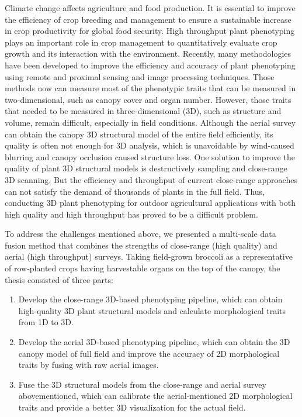 \begin{doublespace}
Climate change affects agriculture and food production. It is essential to improve the efficiency of crop breeding and management to ensure a sustainable increase in crop productivity for global food security. High throughput plant phenotyping plays an important role in crop management to quantitatively evaluate crop growth and its interaction with the environment. Recently, many methodologies have been developed to improve the efficiency and accuracy of plant phenotyping using remote and proximal sensing and image processing techniques. Those methods now can measure most of the phenotypic traits that can be measured in two-dimensional, such as canopy cover and organ number. However, those traits that needed to be measured in three-dimensional (3D), such as structure and volume, remain difficult, especially in field conditions. Although the aerial survey can obtain the canopy 3D structural model of the entire field efficiently, its quality is often not enough for 3D analysis, which is unavoidable by wind-caused blurring and canopy occlusion caused structure loss. One solution to improve the quality of plant 3D structural models is destructively sampling and close-range 3D scanning. But the efficiency and throughput of current close-range approaches can not satisfy the demand of thousands of plants in the full field. Thus, conducting 3D plant phenotyping for outdoor agricultural applications with both high quality and high throughput has proved to be a difficult problem.

To address the challenges mentioned above, we presented a multi-scale data fusion method that combines the strengths of close-range (high quality) and aerial (high throughput) surveys. Taking field-grown broccoli as a representative of row-planted crops having harvestable organs on the top of the canopy, the thesis consisted of three parts: 

\begin{enumerate}
  \item Develop the close-range 3D-based phenotyping pipeline, which can obtain high-quality 3D plant structural models and calculate morphological traits from 1D to 3D.
  \item Develop the aerial 3D-based phenotyping pipeline, which can obtain the 3D canopy model of full field and improve the accuracy of 2D morphological traits by fusing with raw aerial images.
  \item Fuse the 3D structural models from the close-range and aerial survey abovementioned, which can calibrate the aerial-mentioned 2D morphological traits and provide a better 3D visualization for the actual field.
\end{enumerate}


\end{doublespace}

